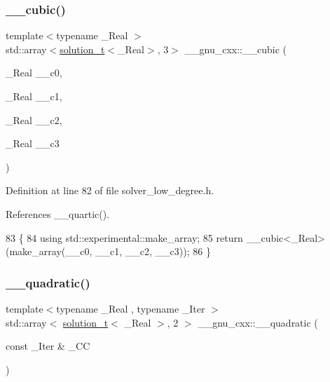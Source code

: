 \subsubsection{\texorpdfstring{\+\_\+\+\_\+cubic()}{\_\_cubic()}\hspace{0.1cm}{\footnotesize\ttfamily [2/2]}}
{\footnotesize\ttfamily template$<$typename \+\_\+\+Real $>$ \\
std\+::array$<$\hyperlink{namespace____gnu__cxx_ae20ea642de50eb361074c62676b0159c}{solution\+\_\+t}$<$\+\_\+\+Real$>$, 3$>$ \+\_\+\+\_\+gnu\+\_\+cxx\+::\+\_\+\+\_\+cubic (\begin{DoxyParamCaption}\item[{\+\_\+\+Real}]{\+\_\+\+\_\+c0,  }\item[{\+\_\+\+Real}]{\+\_\+\+\_\+c1,  }\item[{\+\_\+\+Real}]{\+\_\+\+\_\+c2,  }\item[{\+\_\+\+Real}]{\+\_\+\+\_\+c3 }\end{DoxyParamCaption})\hspace{0.3cm}{\ttfamily [inline]}}



Definition at line 82 of file solver\+\_\+low\+\_\+degree.\+h.



References \+\_\+\+\_\+quartic().


\begin{DoxyCode}
83     \{
84       \textcolor{keyword}{using} std::experimental::make\_array;
85       \textcolor{keywordflow}{return} \_\_cubic<\_Real>(make\_array(\_\_c0, \_\_c1, \_\_c2, \_\_c3));
86     \}
\end{DoxyCode}
\mbox{\label{namespace____gnu__cxx_aa8c3d98e6508a1e20a17c5980ccbbd99}} 
\subsubsection{\texorpdfstring{\+\_\+\+\_\+quadratic()}{\_\_quadratic()}\hspace{0.1cm}{\footnotesize\ttfamily [1/2]}}
{\footnotesize\ttfamily template$<$typename \+\_\+\+Real , typename \+\_\+\+Iter $>$ \\
std\+::array$<$ \hyperlink{namespace____gnu__cxx_ae20ea642de50eb361074c62676b0159c}{solution\+\_\+t}$<$ \+\_\+\+Real $>$, 2 $>$ \+\_\+\+\_\+gnu\+\_\+cxx\+::\+\_\+\+\_\+quadratic (\begin{DoxyParamCaption}\item[{const \+\_\+\+Iter \&}]{\+\_\+\+CC }\end{DoxyParamCaption})}



